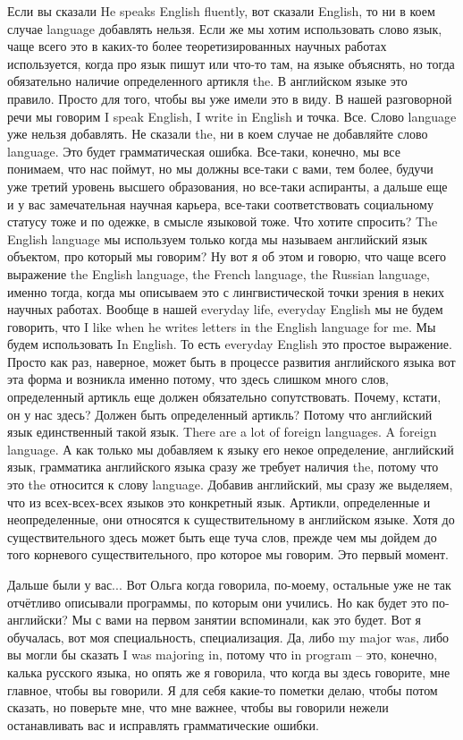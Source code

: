\documentclass[main.tex]{subfiles}
\begin{document}
Если вы сказали He speaks English fluently, вот сказали English, то ни в коем случае language добавлять нельзя.
Если же мы хотим использовать слово язык, чаще всего это в каких-то более теоретизированных научных работах используется, когда про язык пишут или что-то там, на языке объяснять, но тогда обязательно наличие определенного артикля the.
В английском языке это правило.
Просто для того, чтобы вы уже имели это в виду.
В нашей разговорной речи мы говорим I speak English, I write in English и точка.
Все.
Слово language уже нельзя добавлять.
Не сказали the, ни в коем случае не добавляйте слово language.
Это будет грамматическая ошибка.
Все-таки, конечно, мы все понимаем, что нас поймут, но мы должны все-таки с вами, тем более, будучи уже третий уровень высшего образования, но все-таки аспиранты, а дальше еще и у вас замечательная научная карьера, все-таки соответствовать социальному статусу тоже и по одежке, в смысле языковой тоже.
Что хотите спросить? The English language мы используем только когда мы называем английский язык объектом, про который мы говорим?
Ну вот я об этом и говорю, что чаще всего выражение the English language, the French language, the Russian language, именно тогда, когда мы описываем это с лингвистической точки зрения в неких научных работах.
Вообще в нашей everyday life, everyday English мы не будем говорить, что I like when he writes letters in the English language for me.
Мы будем использовать In English.
То есть everyday English это простое выражение.
Просто как раз, наверное, может быть в процессе развития английского языка вот эта форма и возникла именно потому, что здесь слишком много слов, определенный артикль еще должен обязательно сопутствовать.
Почему, кстати, он у нас здесь?
Должен быть определенный артикль?
Потому что английский язык единственный такой язык.
There are a lot of foreign languages.
A foreign language.
А как только мы добавляем к языку его некое определение, английский язык, грамматика английского языка сразу же требует наличия the, потому что это the относится к слову language.
Добавив английский, мы сразу же выделяем, что из всех-всех-всех языков это конкретный язык.
Артикли, определенные и неопределенные, они относятся к существительному в английском языке.
Хотя до существительного здесь может быть еще туча слов, прежде чем мы дойдем до того корневого существительного, про которое мы говорим.
Это первый момент.


Дальше были у вас...
Вот Ольга когда говорила, по-моему, остальные уже не так отчётливо описывали программы, по которым они учились.
Но как будет это по-английски?
Мы с вами на первом занятии вспоминали, как это будет.
Вот я обучалась, вот моя специальность, специализация.
Да, либо my major was, либо вы могли бы сказать I was majoring in, потому что in program -- это, конечно, калька русского языка, но опять же я говорила, что когда вы здесь говорите, мне главное, чтобы вы говорили.
Я для себя какие-то пометки делаю, чтобы потом сказать, но поверьте мне, что мне важнее, чтобы вы говорили нежели останавливать вас и исправлять грамматические ошибки.
\end{document}

